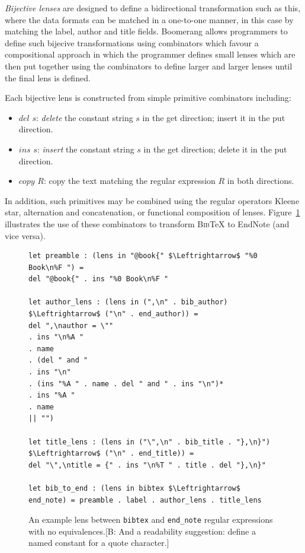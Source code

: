 \documentclass[acmsmall,review,anonymous]{acmart}
\newcommand{\FINISH}[3]{\ifdraft\textcolor{#1}{[#2: #3]}\fi}
\newcommand{\bcp}[1]{\FINISH{dkred}{B}{#1}}
\newcommand{\kw}[1]{\ensuremath{\mathit{#1}}}
\newcommand{\bibtex}{\textsc{Bib}\TeX{}}
\newcommand{\cd}[1]{\lstinline[backgroundcolor=\color{white}]$#1$}
\begin{document}
{\em Bijective lenses} are designed to define a bidirectional transformation
such as this, where the data formats can be matched in a one-to-one manner, in
this case by matching the label, author and title fields. Boomerang allows
programmers to define such bijecive transformations using combinators which
favour a compositional approach in which the programmer defines small lenses
which are then put together using the combinators to define larger and larger
lenses until the final lens is defined. 

Each bijective lens is constructed from simple primitive combinators including:
\begin{itemize}
  \item \kw{del} $s$: \textit{delete} the constant string $s$ in the get
  direction; insert it in the put direction.
  \item \kw{ins} $s$: \textit{insert} the constant string $s$ in the get
  direction; delete it in the put direction.
  \item \kw{copy} $R$: copy the text matching the regular expression $R$ in
  both directions.
\end{itemize}
In addition, such primitives may be combined using the regular operators
Kleene star, alternation and concatenation, or functional composition of
lenses.  Figure~\ref{fig:example-lens} illustrates the use of these
combinators to transform \bibtex{} to EndNote (and vice versa).
\begin{figure}[t]
\begin{lstlisting}
let preamble : (lens in "@book{" $\Leftrightarrow$ "%0 Book\n%F ") =
del "@book{" . ins "%0 Book\n%F "

let author_lens : (lens in (",\n" . bib_author) $\Leftrightarrow$ ("\n" . end_author)) =
del ",\nauthor = \""
. ins "\n%A "
. name
. (del " and "
. ins "\n"
. (ins "%A " . name . del " and " . ins "\n")*
. ins "%A "
. name
|| "")

let title_lens : (lens in ("\",\n" . bib_title . "},\n}") $\Leftrightarrow$ ("\n" . end_title)) =
del "\",\ntitle = {" . ins "\n%T " . title . del "},\n}"

let bib_to_end : (lens in bibtex $\Leftrightarrow$ end_note) = preamble . label . author_lens . title_lens
\end{lstlisting}
\caption{An example lens between \cd{bibtex} and \cd{end_note} regular
expressions with no equivalences.\bcp{And a readability suggestion:
define a named constant for a quote character.}}
\label{fig:example-lens}
\end{figure}
\end{document}
